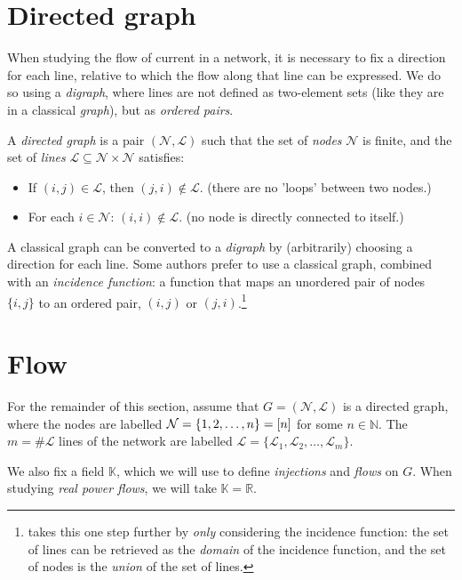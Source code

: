 \documentclass[main.tex]{subfiles}
\begin{document}
\section{Directed graph}
When studying the flow of current in a network, it is necessary to fix a direction for each line, relative to which the flow along that line can be expressed. We do so using a \emph{digraph}, where lines are not defined as two-element sets (like they are in a classical \emph{graph}), but as \emph{ordered pairs}.

\begin{definition}
A \emph{directed graph} is a pair $(\mathcal{N},\mathcal{L})$ such that the set of \emph{nodes} $\mathcal{N}$ is finite, and the set of \emph{lines} $\mathcal{L}\subseteq \mathcal{N} \times \mathcal{N}$ satisfies:
\begin{itemize}
    \item If $(i,j) \in \mathcal{L}$, then $(j,i) \notin \mathcal{L}$. (\ie there are no 'loops' between two nodes.)
    \item For each $i \in \mathcal{N}$: $(i,i) \notin \mathcal{L}$. (\ie no node is directly connected to itself.)
\end{itemize}
\end{definition}

A classical graph can be converted to a \emph{digraph} by (arbitrarily) choosing a direction for each line. Some authors prefer to use a classical graph, combined with an \emph{incidence function}: a function that maps an unordered pair of nodes $\{i,j\}$ to an ordered pair, $(i,j)$ or $(j,i)$.\footnote{\cite{Slepian1968} takes this one step further by \emph{only} considering the incidence function: the set of lines can be retrieved as the \emph{domain} of the incidence function, and the set of nodes is the \emph{union} of the set of lines.}

\section{Flow}
For the remainder of this section, assume that $G=(\mathcal{N},\mathcal{L})$ is a directed graph, where the nodes are labelled $\mathcal{N}=\{1,2,\dots,n\}=[n]$ for some $n \in \mathbb{N}$.
The $m = \# \mathcal{L}$ lines of the network are labelled $\mathcal{L}=\{\mathcal{L}_1,\mathcal{L}_2,\dots,\mathcal{L}_m\}$.

We also fix a field $\mathbb{K}$, which we will use to define \emph{injections} and \emph{flows} on $G$. When studying \emph{real power flows}, we will take $\mathbb{K}=\mathbb{R}$.
\end{document}

